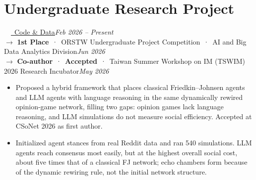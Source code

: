 \documentclass[10pt,letterpaper]{article}
\newenvironment{bullets}{\begin{itemize}[leftmargin=2.3em]}{\end{itemize}}
\begin{document}
\section{Undergraduate Research Project}
\hspace*{0.8em}{\headfont\bfseries Hybrid Coevolutionary Opinion Games (H-COG)}\ \ \href{https://github.com/Evan-Jiamg/Echo-Chamber-Simulation}{\textcolor{linkblue}{\faGithub\ Code \& Data}}\hfill{\itshape Feb 2026 -- Present}\\[0.2em]
\hspace*{0.8em}$\rightarrow$ {\bfseries 1st Place}\ ·\ ORSTW Undergraduate Project Competition\ ·\ AI and Big Data Analytics Division\hfill{\itshape Jun 2026}\\[0.2em]
\hspace*{0.8em}$\rightarrow$ {\bfseries Co-author}\ ·\ {\bfseries Accepted}\ ·\ Taiwan Summer Workshop on IM (TSWIM) 2026 Research Incubator\hfill{\itshape May 2026}\\[0.2em]
\hspace*{0.8em}{\itshape Economics and Computing Lab, NYCU, Advisor: Prof. Po-An Chen}
\begin{bullets}
  \item Proposed a hybrid framework that places classical Friedkin--Johnsen agents and LLM agents with language reasoning in the same dynamically rewired opinion-game network, filling two gaps: opinion games lack language reasoning, and LLM simulations do not measure social efficiency. Accepted at CSoNet 2026 as first author.
  \item Initialized agent stances from real Reddit data and ran 540 simulations. LLM agents reach consensus most easily, but at the highest overall social cost, about five times that of a classical FJ network; echo chambers form because of the dynamic rewiring rule, not the initial network structure.
\end{bullets}

\end{document}
